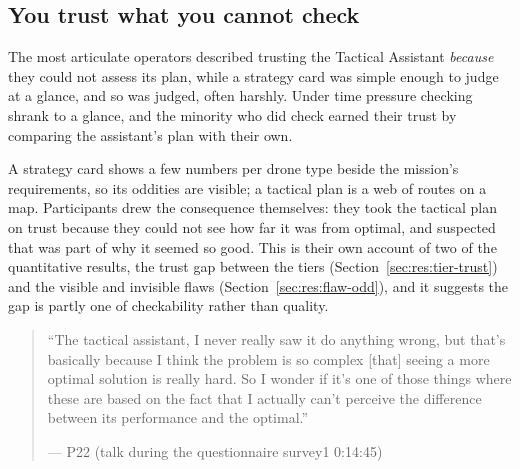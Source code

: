 

\subsection{You trust what you cannot check}\label{sec:qual:trust-unchecked}

The most articulate operators described trusting the Tactical Assistant \emph{because} they could not assess its plan, while a strategy card was simple enough to judge at a glance, and so was judged, often harshly. Under time pressure checking shrank to a glance, and the minority who did check earned their trust by comparing the assistant's plan with their own.


\label{sec:qual:trust-unchecked:cant-check}
A strategy card shows a few numbers per drone type beside the mission's requirements, so its oddities are visible; a tactical plan is a web of routes on a map. Participants drew the consequence themselves: they took the tactical plan on trust because they could not see how far it was from optimal, and suspected that was part of why it seemed so good. This is their own account of two of the quantitative results, the trust gap between the tiers (Section~\ref{sec:res:tier-trust}) and the visible and invisible flaws (Section~\ref{sec:res:flaw-odd}), and it suggests the gap is partly one of checkability rather than quality.

\begin{quote}\small
``The tactical assistant, I never really saw it do anything wrong, but that's basically because I think the problem is so complex [that] seeing a more optimal solution is really hard. So I wonder if it's one of those things where these are based on the fact that I actually can't perceive the difference between its performance and the optimal.''\par\hfill--- P22 (talk during the questionnaire survey1 0:14:45)
\end{quote}

